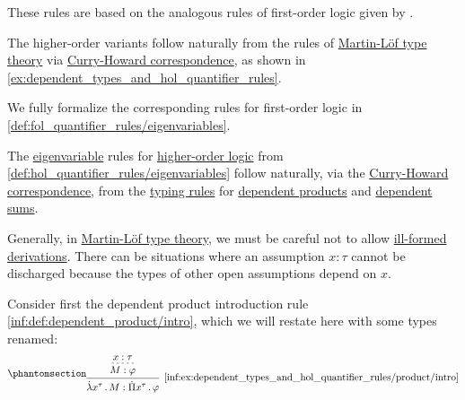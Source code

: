 \begin{comments}
  \item These rules are based on the analogous rules of first-order logic given by .

  The higher-order variants follow naturally from the rules of \hyperref[def:martin_lof_type_theory]{Martin-L\"of type theory} via \hyperref[con:curry_howard_correspondence]{Curry-Howard correspondence}, as shown in \cref{ex:dependent_types_and_hol_quantifier_rules}.

  We fully formalize the corresponding rules for first-order logic in \cref{def:fol_quantifier_rules/eigenvariables}.
\end{comments}

\begin{example}\label{ex:dependent_types_and_hol_quantifier_rules}
  The \hyperref[con:eigenvariable]{eigenvariable} rules for \hyperref[def:higher_order_logic]{higher-order logic} from \cref{def:hol_quantifier_rules/eigenvariables} follow naturally, via the \hyperref[con:curry_howard_correspondence]{Curry-Howard correspondence}, from the \hyperref[con:typing_rule]{typing rules} for \hyperref[def:dependent_product]{dependent products} and \hyperref[def:dependent_sum]{dependent sums}.

  Generally, in \hyperref[def:martin_lof_type_theory]{Martin-L\"of type theory}, we must be careful not to allow \hyperref[def:mltt_well_formed_context/derivation]{ill-formed derivations}. There can be situations where an assumption \( x: \tau \) cannot be discharged because the types of other open assumptions depend on \( x \).

  \begin{thmenum}
     Consider first the dependent product introduction rule \ref{inf:def:dependent_product/intro}, which we will restate here with some types renamed:
    \begin{equation*}\taglabel[\ensuremath{ \Pi_+' }]{inf:ex:dependent_types_and_hol_quantifier_rules/product/intro}
      \begin{prooftree}
        \hypo{ x: \tau }
        \infer[dashed]1{ M: \varphi }
        \infer1[\ref{inf:ex:dependent_types_and_hol_quantifier_rules/product/intro}]{ \qabs {x^\tau} M: \qprod {x^\tau} \varphi }
      \end{prooftree}
    \end{equation*}


\end{thmenum}
\end{example}
